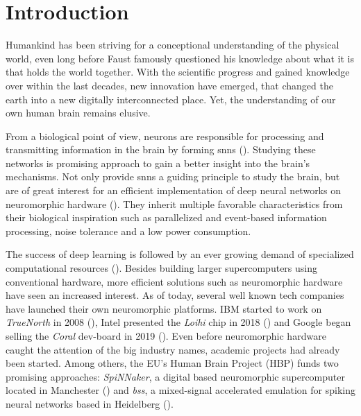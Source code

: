 \chapter{Introduction}


Humankind has been striving for a conceptional understanding of the physical world, even long before Faust famously questioned his knowledge about what it is that holds the world together. With the scientific progress and gained knowledge over within the last decades, new innovation have emerged, that changed the earth into a new digitally interconnected place. Yet, the understanding of our own human brain remains elusive.

From a biological point of view, neurons are responsible for processing and transmitting information in the brain by forming \glspl{snn} (\citealp{gerstner2014dynamics}). Studying these networks is promising approach to gain a better insight into the brain's mechanisms. Not only provide \glspl{snn} a guiding principle to study the brain, but are of great interest for an efficient implementation of deep neural networks on neuromorphic hardware (\citealp{pfeiffer2018deep}). They inherit multiple favorable characteristics from their biological inspiration such as parallelized and event-based information processing, noise tolerance and a low power consumption.

The success of deep learning is followed by an ever growing demand of specialized computational resources (\citealp{mayer2020scalable}). Besides building larger supercomputers using conventional hardware, more efficient solutions such as neuromorphic hardware have seen an increased interest. As of today, several well known tech companies have launched their own neuromorphic platforms. IBM started to work on \emph{TrueNorth} in 2008 (\citealp{akopyan2015truenorth}), Intel presented the \emph{Loihi} chip in 2018 (\citealp{davies2018loihi}) and Google began selling the \emph{Coral} dev-board in 2019 (\citealp{cass2019taking}). Even before neuromorphic hardware caught the attention of the big industry names, academic projects had already been started. Among others, the EU's Human Brain Project (HBP) funds two promising approaches: \emph{SpiNNaker}, a digital based neuromorphic supercomputer located in Manchester (\citealp{furber2014spinnaker}) and \emph{\gls{bss}}, a mixed-signal accelerated emulation for spiking neural networks based in Heidelberg (\citealp{brainscales_webpublic}).

